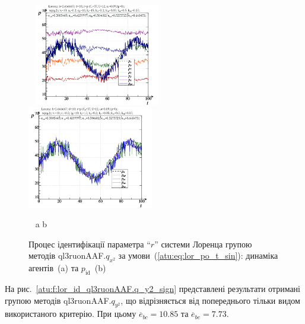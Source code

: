 \begin{figure}[ht!]
  \begin{center}
    ~ \hfill
    \includegraphics[width=0.49\textwidth]{p/cha/lor/ql3ruonAAF/lor_ql3ruonAAF_qy2-p_t_pi_sin.png}
    \hfill
    \includegraphics[width=0.49\textwidth]{p/cha/lor/ql3ruonAAF/lor_ql3ruonAAF_qy2-p_t_pz_sin.png}
    \hfill ~
  \end{center}
  \vspace{-1.0ex}
  \begin{center}
    ~ \hfill a \hfill\hfill b \hfill ~
  \end{center}
  \vspace{-1.5ex}
  \caption{Процес ідентифікації параметра ``$r$'' системи Лоренца групою методів ql3ruonAAF.$q_{x^2} $ за умови~(\ref{atu:eq:lor_po_t_sin}): динаміка агентів~(a) та $p_\mathrm{id}$~(b)}
\label{atu:f:lor_id_ql3ruonAAF.q_x2_sin}
\end{figure}


На рис.~\ref{atu:f:lor_id_ql3ruonAAF.q_y2_sign} представлені результати отримані
групою методів ql3ruonAAF.$q_{y^2}$, що відрізняється від попереднього тільки видом
використаного критерію. При цьому
$\overline{e}_{bc}=10.85$
та
$\overline{e}_{be}=7.73$.

